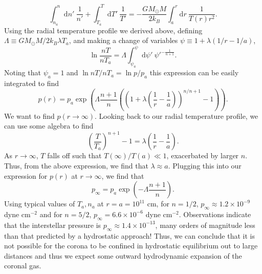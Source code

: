	\begin{equation}
		\int_{n_a}^{n}\mathrm{d}n'~\frac{1}{n'} + \int_{T_a}^{T}\mathrm{d}T'~\frac{1}{T'} = -\frac{GM_{\odot}M}{2k_B}\int^r_a\mathrm{d}r~\frac{1}{T(r)r^2}.
	\end{equation}
	Using the radial temperature profile we derived above, defining $\Lambda\equiv GM_{\odot}M/2k_B\lambda T_a$, and making a change of variables $\psi\equiv 1 + \lambda(1/r - 1/a)$, 
	\begin{equation}
		\ln{\frac{nT}{nT_a}} = \Lambda\int^{\psi}_{\psi_a}\mathrm{d}\psi'~\psi'^{-\frac{1}{n+1}}.
	\end{equation}
	Noting that $\psi_a=1$ and $\ln{nT/nT_a}=\ln{p/p_a}$ this expression can be easily integrated to find
	\begin{equation}
		p(r) = p_a\exp\left(\Lambda\frac{n+1}{n}\left(\left(1 + \lambda\left(\frac{1}{r} - \frac{1}{a}\right)\right)^{n/n+1} - 1 \right)\right).
	\end{equation}
	We want to find $p(r\to\infty)$. Looking back to our radial temperature profile, we can use some algebra to find
	\begin{equation}
		\left(\frac{T}{T_a}\right)^{n+1} - 1 = \lambda\left(\frac{1}{r} - \frac{1}{a}\right).
	\end{equation}
	As $r\to\infty$, $T$ falls off such that $T(\infty)/T(a)\ll1$, exacerbated by larger $n$. Thus, from the above expression, we find that $\lambda\approx a$. Plugging this into our expression for $p(r)$ at $r\to\infty$, we find that 
	\begin{equation}
		p_{\infty} = p_a\exp\left(-\Lambda\frac{n+1}{n}\right).
	\end{equation}
	Using typical values of $T_a,n_a$ at $r=a=10^{11}$ cm, for $n=1/2$, $p_{\infty}\approx1.2\times10^{-9}$ dyne cm$^{-2}$ and for $n=5/2$, $p_{\infty}=6.6\times10^{-6}$ dyne cm$^{-2}$. Observations indicate that the interstellar pressure is $p_{\infty}\approx1.4\times10^{-13}$, many orders of magnitude less than that predicted by a hydrostatic approach! Thus, we can conclude that it is not possible for the corona to be confined in hydrostatic equilibrium out to large distances and thus we expect some outward hydrodynamic expansion of the coronal gas.

